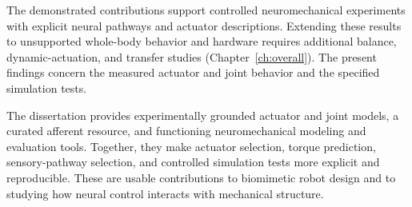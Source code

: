 The demonstrated contributions support controlled neuromechanical experiments with explicit neural pathways and actuator descriptions. Extending these results to unsupported whole-body behavior and hardware requires additional balance, dynamic-actuation, and transfer studies (Chapter~\ref{ch:overall}). The present findings concern the measured actuator and joint behavior and the specified simulation tests.

The dissertation provides experimentally grounded actuator and joint models, a curated afferent resource, and functioning neuromechanical modeling and evaluation tools. Together, they make actuator selection, torque prediction, sensory-pathway selection, and controlled simulation tests more explicit and reproducible. These are usable contributions to biomimetic robot design and to studying how neural control interacts with mechanical structure.


